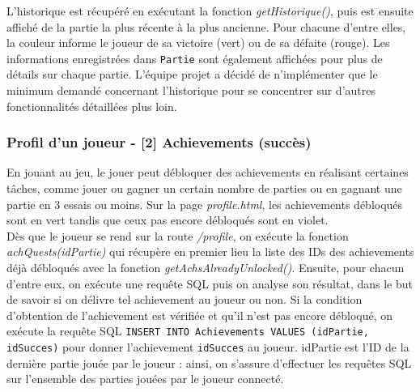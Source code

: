 \tabto{1cm}L'historique est récupéré en exécutant la fonction \emph{getHistorique()}, puis est ensuite affiché de la partie la plus récente à la plus ancienne. Pour chacune d'entre elles, la couleur informe le joueur de sa victoire (vert) ou de sa défaite (rouge). Les informations enregistrées dans \texttt{Partie} sont également affichées pour plus de détails sur chaque partie. L'équipe projet a décidé de n'implémenter que le minimum demandé concernant l'historique pour se concentrer sur d'autres fonctionnalités détaillées plus loin.

\subsubsection*{Profil d'un joueur - [2] Achievements (succès)}

\tabto{1cm}En jouant au jeu, le jouer peut débloquer des achievements en réalisant certaines tâches, comme jouer ou gagner un certain nombre de parties ou en gagnant une partie en 3 essais ou moins. Sur la page \emph{profile.html}, les achievements débloqués sont en vert tandis que ceux pas encore débloqués sont en violet. \\

\tabto{1cm}Dès que le joueur se rend sur la route \emph{/profile}, on exécute la fonction \emph{achQuests(idPartie)} qui récupère en premier lieu la liste des IDs des achievements déjà débloqués avec la fonction \emph{getAchsAlreadyUnlocked()}. Ensuite, pour chacun d'entre eux, on exécute une requête SQL puis on analyse son résultat, dans le but de savoir si on délivre tel achievement au joueur ou non. Si la condition d'obtention de l'achievement est vérifiée et qu'il n'est pas encore débloqué, on exécute la requête SQL \texttt{INSERT INTO Achievements VALUES (idPartie, idSucces)} pour donner l'achievement \texttt{idSucces} au joueur. idPartie est l'ID de la dernière partie jouée par le joueur : ainsi, on s'assure d'effectuer les requêtes SQL sur l'ensemble des parties jouées par le joueur connecté.


